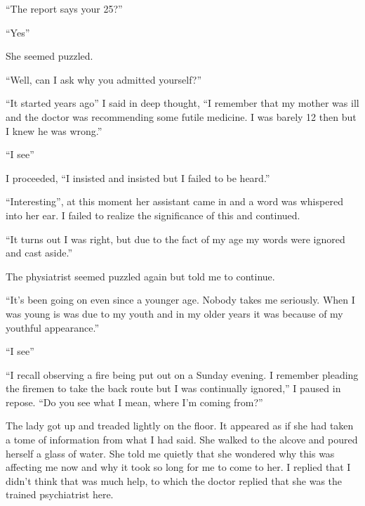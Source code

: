 ``The report says your 25?''



``Yes''



She seemed puzzled.



``Well, can I ask why you admitted yourself?''



``It started years ago'' I said in deep thought, ``I
remember that my mother was ill and the doctor was recommending
some futile medicine. I was barely 12 then but I knew he was
wrong.''



``I see''



I proceeded, ``I insisted and insisted but I failed to be
heard.''



``Interesting'', at this moment her assistant came in and
a word was whispered into her ear. I failed to realize the
significance of this and continued.



``It turns out I was right, but due to the fact of my age my
words were ignored and cast aside.''



The physiatrist seemed puzzled again but told me to continue.



``It's been going on even since a younger age. Nobody
takes me seriously. When I was young is was due to my youth and in
my older years it was because of my youthful
appearance.''



``I see''



``I recall observing a fire being put out on a Sunday evening.
I remember pleading the firemen to take the back route but I was
continually ignored,'' I paused in repose. ``Do you see
what I mean, where I'm coming from?''



The lady got up and treaded lightly on the floor. It appeared as if
she had taken a tome of information from what I had said. She
walked to the alcove and poured herself a glass of water. She told
me quietly that she wondered why this was affecting me now and why
it took so long for me to come to her. I replied that I
didn't think that was much help, to which the doctor replied
that she was the trained psychiatrist here.



